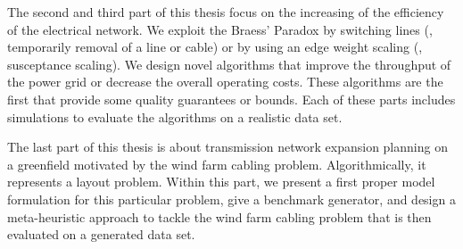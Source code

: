 The second and third part of this thesis focus on the increasing of the
efficiency of the electrical network. We exploit the Braess' Paradox by
switching lines (\ie, temporarily removal of a line or cable) or by using an
edge weight scaling (\ie, susceptance scaling). We design novel algorithms that
improve the throughput of the power grid or decrease the overall operating
costs. These algorithms are the first that provide some quality guarantees or
bounds. Each of these parts includes simulations to evaluate the algorithms on a
realistic data set.

The last part of this thesis is about transmission network expansion planning on
a greenfield motivated by the wind farm cabling problem. Algorithmically, it
represents a layout problem. Within this part, we present a first proper model
formulation for this particular problem, give a benchmark generator, and design
a meta-heuristic approach to tackle the wind farm cabling problem that is then
evaluated on a generated data set.
% 